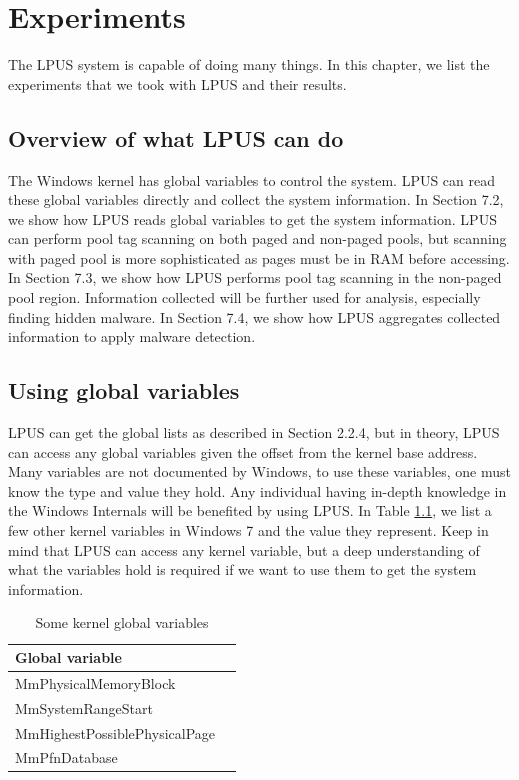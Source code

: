 \chapter[Experiments]{Experiments}

The LPUS system is capable of doing many things. In this chapter, we list the
experiments that we took with LPUS and their results.

\section[Overview of what LPUS can do]{Overview of what LPUS can do}

The Windows kernel has global variables to control the system. LPUS can read
these global variables directly and collect the system information. In Section
7.2, we show how LPUS reads global variables to get the system information.
LPUS can perform pool tag scanning on both paged and non-paged pools, but
scanning with paged pool is more sophisticated as pages must be in RAM before
accessing. In Section 7.3, we show how LPUS performs pool tag scanning in the
non-paged pool region. Information collected will be further used for analysis,
especially finding hidden malware. In Section 7.4, we show how LPUS aggregates
collected information to apply malware detection.

\section[Using global variables]{Using global variables}

LPUS can get the global lists as described in Section 2.2.4, but in theory,
LPUS can access any global variables given the offset from the kernel base
address.  Many variables are not documented by Windows, to use these variables,
one must know the type and value they hold. Any individual having in-depth
knowledge in the Windows Internals will be benefited by using LPUS. In Table
\ref{tab:globalvars}, we list a few other kernel variables in Windows 7 and the
value they represent. Keep in mind that LPUS can access any kernel variable,
but a deep understanding of what the variables hold is required if we want to
use them to get the system information.

\begin{table}[t]
\centering
\begin{tabular}{ll}
\hline
  Global variable               \\ \hline
  MmPhysicalMemoryBlock         \\
  MmSystemRangeStart            \\
  MmHighestPossiblePhysicalPage \\
  MmPfnDatabase                 \\
\hline
\end{tabular}
\caption{Some kernel global variables}
\label{tab:globalvars}
\end{table}

